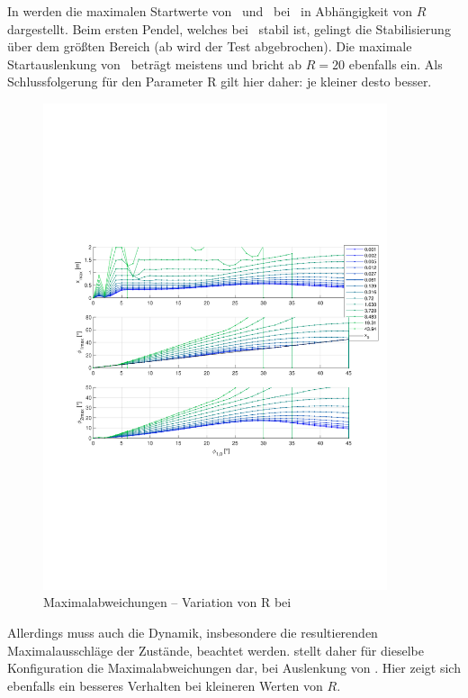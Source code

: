 In  werden die maximalen Startwerte von \phe\ und \phz\ bei \apz\ in Abhängigkeit von $R$ dargestellt.
Beim ersten Pendel, welches bei \apz\ stabil ist, gelingt die Stabilisierung über dem größten Bereich (ab  wird der Test abgebrochen).
Die maximale Startauslenkung von \phz\ beträgt meistens  und bricht ab $R=20$ ebenfalls ein.
Als Schlussfolgerung für den Parameter R gilt hier daher: je kleiner desto besser.

\begin{figure}[htbp]
	\centering
		\includegraphics[width=0.9\textwidth]{Bilder/QRVariation/ap2/R phi1 m.pdf}
	\caption{Maximalabweichungen -- Variation von R bei \apz}
	\label{fig:qrap2Rm}
\end{figure}

Allerdings muss auch die Dynamik, insbesondere die resultierenden Maximalausschläge der Zustände, beachtet werden.
 stellt daher für dieselbe Konfiguration die Maximalabweichungen dar, bei Auslenkung von \phe.
Hier zeigt sich ebenfalls ein besseres Verhalten bei kleineren Werten von $R$.

